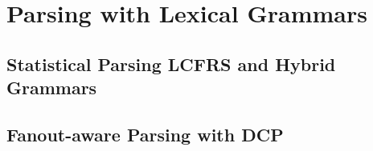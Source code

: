 \documentclass[../document.tex]{subfiles}
\begin{document}
    \chapter{Parsing with Lexical Grammars}

    \section{Statistical Parsing LCFRS and Hybrid Grammars}
    \section{Fanout-aware Parsing with DCP}

    \printindex
\end{document}
